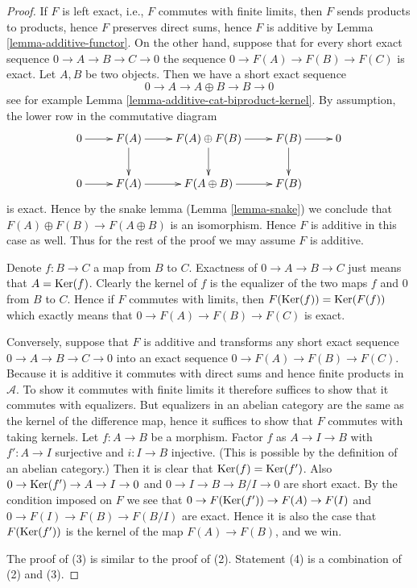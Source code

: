\begin{proof}
If $F$ is left exact, i.e., $F$ commutes with finite limits, then
$F$ sends products to products, hence $F$ preserves direct sums,
hence $F$ is additive by Lemma \ref{lemma-additive-functor}.
On the other hand, suppose that for every short exact sequence
$0 \to A \to B \to C \to 0$ the sequence $0 \to F(A) \to F(B) \to F(C)$
is exact. Let $A, B$ be two objects. Then we have a short
exact sequence
$$
0 \to A \to A \oplus B \to B \to 0
$$
see for example Lemma \ref{lemma-additive-cat-biproduct-kernel}.
By assumption, the lower row in the commutative diagram
$$
\xymatrix{
0 \ar[r] &
F(A) \ar[d] \ar[r] &
F(A) \oplus F(B) \ar[r] \ar[d] &
F(B) \ar[d] \ar[r] &
0 \\
0 \ar[r] &
F(A) \ar[r] &
F(A \oplus B) \ar[r] &
F(B)
}
$$
is exact. Hence by the snake lemma (Lemma \ref{lemma-snake})
we conclude that $F(A) \oplus F(B) \to F(A \oplus B)$ is an
isomorphism. Hence $F$ is additive in this case as well.
Thus for the rest of the proof we may assume $F$ is additive.

\medskip\noindent
Denote $f : B \to C$ a map from $B$ to $C$.
Exactness of $0 \to A \to B \to C$ just means that
$A = \mathop{\mathrm{Ker}}(f)$. Clearly the kernel of $f$ is
the equalizer of the two maps $f$ and $0$ from $B$ to $C$.
Hence if $F$ commutes with limits, then $F(\mathop{\mathrm{Ker}}(f))
= \mathop{\mathrm{Ker}}(F(f))$ which exactly means that
$0 \to F(A) \to F(B) \to F(C)$ is exact.

\medskip\noindent
Conversely, suppose that $F$ is additive and
transforms any short exact sequence $0 \to A \to B \to C \to 0$ into
an exact sequence $0 \to F(A) \to F(B) \to F(C)$.
Because it is additive it commutes with direct sums
and hence finite products in $\mathcal{A}$. To show
it commutes with finite limits it therefore
suffices to show that it commutes with
equalizers. But equalizers in an abelian category
are the same as the kernel of the difference map,
hence it suffices to show that $F$ commutes with
taking kernels. Let $f : A \to B$ be a morphism.
Factor $f$ as $A \to I \to B$ with $f' : A \to I$ surjective
and $i : I \to B$ injective. (This is possible by the
definition of an abelian category.) Then it is
clear that $\mathop{\mathrm{Ker}}(f) = \mathop{\mathrm{Ker}}(f')$. Also
$0 \to \mathop{\mathrm{Ker}}(f') \to A \to I \to 0$
and
$0 \to I \to B \to B/I \to 0$
are short exact. By the condition imposed on $F$
we see that
$0 \to F(\mathop{\mathrm{Ker}}(f')) \to F(A) \to F(I)$
and
$0 \to F(I) \to F(B) \to F(B/I)$
are exact. Hence it is also the case that
$F(\mathop{\mathrm{Ker}}(f'))$ is the kernel of the map
$F(A) \to F(B)$, and we win.

\medskip\noindent
The proof of (3) is similar to the proof of (2).
Statement (4) is a combination of (2) and (3).
\end{proof}

